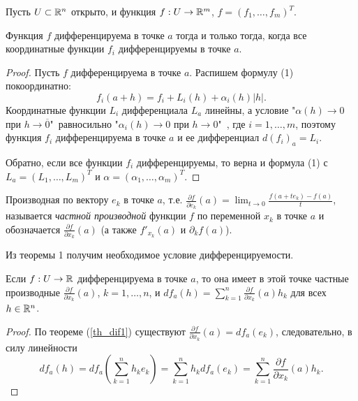 Пусть $U \subset \mathbb{R}^{n}$ открыто, и функция $f: U \to \mathbb{R}^{m}$, $f = (f_{1}, \ldots, f_{m})^{T}$.

\begin{lemma}
    \label{dif-lem1}
    Функция $f$ дифференцируема в точке $a$ тогда и только тогда, когда все координатные функции $f_{i}$ дифференцируемы в точке $a$.
\end{lemma}

\begin{proof}
    Пусть $f$ дифференцируема в точке $a$. Распишем формулу (1) покоординатно:
    \[f_{i}(a + h) = f_{i} + L_{i}(h) + \alpha_{i}(h)|h|.\]
    Координатные функции $L_{i}$ дифференциала $L_{a}$ линейны, а условие "$\alpha(h) \to 0$ при $h \to \overline{0}$"\ равносильно "$\alpha_{i}(h) \to 0$ при $h \to 0$"\ , где $i = 1, \ldots, m$, поэтому функция $f_{i}$ дифференцируема в точке $a$ и ее дифференциал $d(f_{i})_{a} = L_{i}$.

    Обратно, если все функции $f_{i}$ дифференцируемы, то верна и формула (1) с $L_{a} = (L_{1}, \ldots, L_{m})^{T}$ и $\alpha = (\alpha_{1}, \ldots, \alpha_{m})^{T}$.
\end{proof}

\begin{definition}
    Производная по вектору $e_{k}$ в точке $a$, т.е. $\frac{\partial f}{\partial e_{k}}(a) = \lim_{t \to 0}\frac{f(a + t e_{k}) - f(a)}{t}$, называется \textit{частной производной} функции $f$ по переменной $x_{k}$ в точке $a$ и обозначается $\frac{\partial f}{\partial x_{k}}(a)$ (а также $f'_{x_{k}}(a)$ и $\partial_{k}f(a)$).
\end{definition}

Из теоремы 1 получим необходимое условие дифференцируемости.

\begin{corollary}
    Если $f: U \to \mathbb{R}$ дифференцируема в точке $a$, то она имеет в этой точке частные производные $\frac{\partial f}{\partial x_{k}}(a)$, $k = 1, \ldots, n$, и $df_{a}(h) = \sum_{k = 1}^{n}\frac{\partial f}{\partial x_{k}}(a)h_{k}$ для всех $h \in \mathbb{R}^{n}$.
\end{corollary}

\begin{proof}
    По теореме (\ref{th_dif1}) существуют $\frac{\partial f}{\partial x_{k}}(a) = df_{a}(e_{k})$, следовательно, в силу линейности
    \[df_{a}(h) = df_{a}\left(\sum_{k = 1}^{n}h_{k}e_{k}\right) = \sum_{k = 1}^{n}h_{k}df_{a}(e_{k}) = \sum_{k = 1}^{n}\frac{\partial f}{\partial x_{k}}(a)h_{k}.\]
\end{proof}

